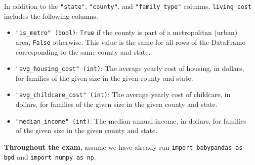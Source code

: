 \documentclass[twoside,12pt]{article}
\begin{document}
\vspace{.1in}

\noindent In addition to the \texttt{"state"}, \texttt{"county"}, and \texttt{"family\_type"} columns, \texttt{living\_cost} includes the following columns.

\begin{itemize}
    \item \texttt{"is\_metro" (bool)}: \texttt{True} if the county is part of a metropolitan (urban) area, \texttt{False} otherwise.  This value is the same for all rows of the DataFrame corresponding to the same county and state.
    \item \texttt{"avg\_housing\_cost" (int)}: The average yearly cost of housing, in dollars, for families of the given size in the given county and state.
    \item \texttt{"avg\_childcare\_cost" (int)}: The average yearly cost of childcare, in dollars, for families of the given size in the given county and state.
    \item \texttt{"median\_income" (int)}: The median annual income, in dollars, for families of the given size in the given county and state.

    
\end{itemize}


\vspace{.1in}

\noindent \textbf{Throughout the exam}, assume we have already run \texttt{import babypandas as bpd} and \texttt{import numpy as np}.
\end{document}
